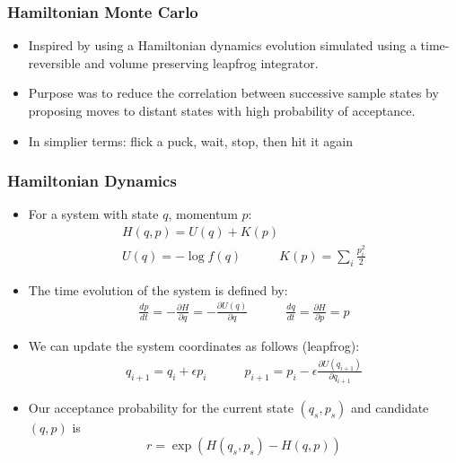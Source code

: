 \documentclass{beamer}
\begin{document}
\begin{frame}
  \frametitle{Hamiltonian Monte Carlo}
  \begin{itemize}
    \item Inspired by using a Hamiltonian dynamics evolution simulated using
    a time-reversible and volume preserving leapfrog integrator.
    \item Purpose was to reduce the correlation between successive sample states by proposing
    moves to distant states with high probability of acceptance.
    \item In simplier terms: flick a puck, wait, stop, then hit it again
  \end{itemize}
\end{frame}

\begin{frame}
  \frametitle{Hamiltonian Dynamics}
  \begin{itemize}
    \item For a system with state $q$, momentum $p$:
  \begin{gather*}
    H(q, p) = U(q) + K(p) \\
    U(q) = - \log f(q) \quad\quad\quad K(p) = \sum_i \frac{p_i^2}{2}
  \end{gather*}
    \item The time evolution of the system is defined by:
  \begin{gather*}
    \frac{d p}{d t} = - \frac{\partial H}{\partial q} = - \frac{\partial U(q)}{\partial q} \quad\quad\quad \frac{d q}{d t} = \frac{\partial H}{\partial p} = p
  \end{gather*}
    \item We can update the system coordinates as follows (leapfrog):
  \begin{gather*}
    q_{i+1} = q_i + \epsilon p_i \quad\quad\quad p_{i+1} = p_i - \epsilon \frac{\partial U(q_{i+1})}{\partial q_{i+1}}
  \end{gather*}
    \item Our acceptance probability for the current state $(q_s, p_s)$ and candidate $(q, p)$ is
  \begin{equation*}
    r = \exp \left( H(q_s, p_s) - H(q, p) \right)
  \end{equation*}
  \end{itemize}
\end{frame}
\end{document}
